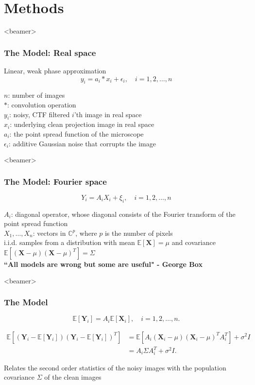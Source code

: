 \documentclass{beamer}
\begin{document}
\section{Methods}
\begin{frame}<beamer>
\frametitle{The Model: Real space}
Linear, weak phase approximation\\

\begin{equation}
 y_i = a_i \ast x_i + \epsilon_i, \quad i=1,2,\ldots,n
\label{eqn:model}
\end{equation}

$n$: number of images\\
$\ast$: convolution operation\\
$y_i$: noisy, CTF filtered $i$'th image in real space\\
$x_i$: underlying clean projection image in real space\\
$a_{i}$: the point spread function of the microscope\\
$\epsilon_i$: additive Gaussian noise that corrupts the image
\end{frame}

\begin{frame}<beamer>
\frametitle{The Model: Fourier space}

\begin{equation}
 Y_i = A_i X_i + \xi_i, \quad i=1,2,\ldots,n
\label{eqn:model_f}
\end{equation}

$A_i$: diagonal operator, whose
diagonal consists of the Fourier transform of the point spread function\\

$X_1,\dots,X_n$: vectors in $\mathbb{C}^p$, where $p$ is the number of pixels\\
i.i.d. samples from a distribution with mean $\mathbb{E}[\textbf{X}]=\mu$
and covariance $\mathbb{E}[(\textbf{X}-\mu)(\textbf{X}-\mu)^T]=\Sigma$\\


\textbf{\alert{``All models are wrong but some are useful" - George Box}}
\end{frame}

\begin{frame}<beamer>
\frametitle{The Model}
\begin{equation}
\mathbb{E}[\textbf{Y}_i]=A_i \mathbb{E}[\textbf{X}_i], \quad i=1,2,\ldots,n.
\label{eqn:exp_y}
\end{equation}

\begin{equation}
\begin{aligned}
\mathbb{E}[(\textbf{Y}_i-\mathbb{E}[\textbf{Y}_i])(\textbf{Y}_i-\mathbb{E}[\textbf{Y}_i])^T] 
&= \mathbb{E} [A_i(\textbf{X}_i-\mu)(\textbf{X}_i-\mu)^T A_i^T] + \sigma^2I \\
&=  A_i \Sigma A_i^T + \sigma^2I .
\end{aligned}
\label{eqn:expectation_eq}
\end{equation}

Relates the second order statistics of the noisy images with the 
population covariance $\Sigma$ of the clean images
\end{frame}
\end{document}
